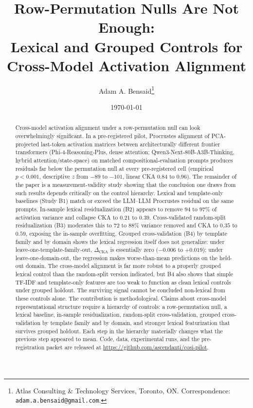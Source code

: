 \documentclass[11pt]{article}
\title{
Row-Permutation Nulls Are Not Enough: \\
\large Lexical and Grouped Controls for Cross-Model Activation Alignment
}
\author{
  Adam A. Bensaid\thanks{Atlas Consulting \& Technology Services, Toronto, ON. Correspondence: \texttt{adam.a.bensaid@gmail.com}.}
}
\date{\today}
\begin{document}
\maketitle

\begin{abstract}
Cross-model activation alignment under a row-permutation null can
look overwhelmingly significant. In a pre-registered pilot,
Procrustes alignment of PCA-projected last-token activation
matrices between architecturally different frontier transformers
(Phi-4-Reasoning-Plus, dense attention; Qwen3-Next-80B-A3B-Thinking,
hybrid attention/state-space) on matched compositional-evaluation
prompts produces residuals far below the permutation null at every
pre-registered cell (empirical $p < 0.001$, descriptive $z$ from
$-89$ to $-101$, linear CKA $0.84$ to $0.96$). The remainder of the
paper is a measurement-validity study showing that the conclusion
one draws from such results depends critically on the control
hierarchy. Lexical and template-only baselines (Study B1) match or
exceed the LLM--LLM Procrustes residual on the same prompts.
In-sample lexical residualization (B2) appears to remove $94$ to
$97\%$ of activation variance and collapse CKA to $0.21$ to $0.39$.
Cross-validated random-split residualization (B3) moderates this to
$72$ to $88\%$ variance removed and CKA to $0.35$ to $0.59$,
exposing the in-sample overfitting. Grouped cross-validation (B4)
by template family and by domain shows the lexical regression
itself does not generalize: under leave-one-template-family-out,
$\Delta_\text{CKA}$ is essentially zero ($-0.006$ to $+0.019$);
under leave-one-domain-out, the regression makes worse-than-mean
predictions on the held-out domain. The cross-model alignment is
far more robust to a properly grouped lexical control than the
random-split version indicated, but B4 also shows that simple
TF-IDF and template-only features are too weak to function as clean
lexical controls under grouped holdout. The surviving signal cannot
be concluded non-lexical from these controls alone. The
contribution is methodological. Claims about cross-model
representational structure require a hierarchy of controls: a
row-permutation null, a lexical baseline, in-sample residualization,
random-split cross-validation, grouped cross-validation by template
family and by domain, and stronger lexical featurization that
survives grouped holdout. Each step in the hierarchy materially
changes what the previous step appeared to mean. Code, data,
experimental runs, and the pre-registration packet are released at
\url{https://github.com/ascendanti/cosi-pilot}.
\end{abstract}
\end{document}
